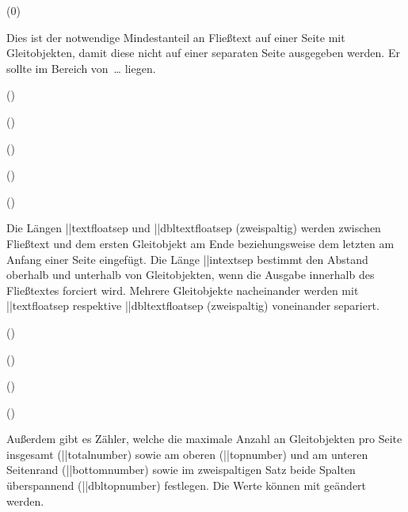 \begin{Entity}{}
\begin{Declaration}
  {}
  (0\textfraction)
\printdeclarationlist

Dies ist der notwendige Mindestanteil an Fließtext auf einer Seite mit 
Gleitobjekten, damit diese nicht auf einer separaten Seite ausgegeben werden. 
Er sollte im Bereich von~\dots{} liegen.
\end{Declaration}

\begin{Declaration}
  {}
  (\the\textfloatsep)
\begin{Declaration}
  {}
  (\the\dbltextfloatsep)
\begin{Declaration}
  {}
  (\the\intextsep)
\begin{Declaration}
  {}
  (\the\floatsep)
\begin{Declaration}
  {}
  (\the\dblfloatsep)
\printdeclarationlist[Längen]

Die Längen \Length||{textfloatsep} und \Length||{dbltextfloatsep} (zweispaltig) 
werden zwischen Fließtext und dem ersten Gleitobjekt am Ende beziehungsweise 
dem letzten am Anfang einer Seite eingefügt. Die Länge \Length||{intextsep} 
bestimmt den Abstand oberhalb und unterhalb von Gleitobjekten, wenn die Ausgabe 
innerhalb des Fließtextes forciert wird. Mehrere Gleitobjekte nacheinander 
werden mit \Length||{textfloatsep} respektive \Length||{dbltextfloatsep} 
(zweispaltig) voneinander separiert.
\end{Declaration}
\end{Declaration}
\end{Declaration}
\end{Declaration}
\end{Declaration}

\begin{Declaration}
  {}
  ()
\begin{Declaration}
  {}
  ()
\begin{Declaration}
  {}
  ()
\begin{Declaration}
  {}
  ()
\printdeclarationlist[Zähler]

Außerdem gibt es Zähler, welche die maximale Anzahl an Gleitobjekten pro Seite 
insgesamt (\Counter||{totalnumber}) sowie am oberen (\Counter||{topnumber}) 
und am unteren Seitenrand (\Counter||{bottomnumber}) sowie im zweispaltigen 
Satz beide Spalten überspannend (\Counter||{dbltopnumber}) festlegen. Die Werte 
können mit  geändert werden.
\end{Declaration}
\end{Declaration}
\end{Declaration}
\end{Declaration}


\end{Entity}
